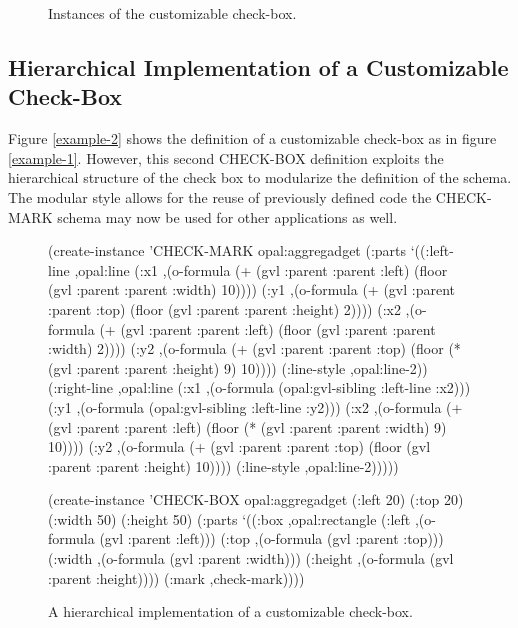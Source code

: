 \begin{figure}
\begin{center}
\end{center}

\caption{Instances of the customizable check-box.}
\end{figure}


\subsection{Hierarchical Implementation of a Customizable Check-Box}
\label{custom-check-box2}

Figure \ref{example-2} shows the definition of a
customizable check-box as in figure \ref{example-1}.  However, this
second CHECK-BOX definition exploits the hierarchical structure of the
check box to modularize the definition of the schema.  The modular style
allows for the reuse of previously defined code  the CHECK-MARK schema
may now be used for other applications as well.

\begin{figure}
\begin{programexample}
(create-instance 'CHECK-MARK opal:aggregadget
  (:parts
   `((:left-line ,opal:line
      (:x1 ,(o-formula (+ (gvl :parent :parent :left)
			  (floor (gvl :parent :parent :width) 10))))
      (:y1 ,(o-formula (+ (gvl :parent :parent :top)
			  (floor (gvl :parent :parent :height) 2))))
      (:x2 ,(o-formula (+ (gvl :parent :parent :left)
			  (floor (gvl :parent :parent :width) 2))))
      (:y2 ,(o-formula (+ (gvl :parent :parent :top)
			  (floor (* (gvl :parent :parent :height) 9) 10))))
      (:line-style ,opal:line-2))
     (:right-line ,opal:line
      (:x1 ,(o-formula (opal:gvl-sibling :left-line :x2)))
      (:y1 ,(o-formula (opal:gvl-sibling :left-line :y2)))
      (:x2 ,(o-formula (+ (gvl :parent :parent :left)
			  (floor (* (gvl :parent :parent :width) 9) 10))))
      (:y2 ,(o-formula (+ (gvl :parent :parent :top)
			  (floor (gvl :parent :parent :height) 10))))
      (:line-style ,opal:line-2)))))

(create-instance 'CHECK-BOX opal:aggregadget
  (:left 20)
  (:top 20)
  (:width 50)
  (:height 50)
  (:parts
   `((:box ,opal:rectangle
      (:left ,(o-formula (gvl :parent :left)))
      (:top ,(o-formula (gvl :parent :top)))
      (:width ,(o-formula (gvl :parent :width)))
      (:height ,(o-formula (gvl :parent :height))))
     (:mark ,check-mark))))
\end{programexample}
\caption{A hierarchical implementation of a customizable check-box.}
\end{figure}


